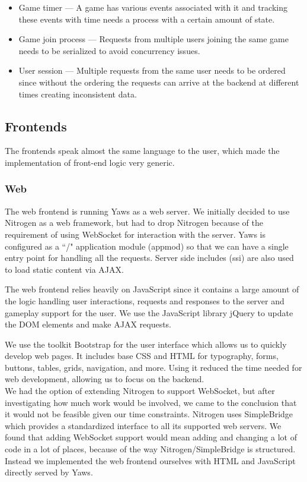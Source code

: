 \documentclass[11pt,a4paper]{report}
\begin{document}
\begin{itemize}
\item Game timer --- A game has various events associated with it and
tracking these events with time needs a process with a certain amount
of state.
\item Game join process --- Requests from multiple users joining the same
game needs to be serialized to avoid concurrency issues.
\item User session --- Multiple requests from the same user needs to be
ordered since without the ordering the requests can arrive at the backend
at different times creating inconsistent data.
\end{itemize}

\subsection{Frontends}
\label{sec:frontends}
The frontends speak almost the same language to the user, which made the
implementation of front-end logic very generic.

\subsubsection{Web}
The web frontend is running Yaws as a web server.
We initially decided to use Nitrogen as a web framework, but had to drop Nitrogen
because of the requirement of using WebSocket for interaction with the server.
Yaws is configured as a ``/" application module (appmod) so that we can have a
single entry point for handling all the requests. Server side includes (ssi) are
also used to load static content via AJAX.

The web frontend relies heavily on JavaScript since it contains a large amount
of the logic handling user interactions, requests and responses to the server
and gameplay support for the user. We use the JavaScript library jQuery
\cite{jquery} to update the DOM elements and make AJAX requests.

We use the toolkit Bootstrap\cite{bootstrap} for the user interface which
allows us to quickly develop web pages. It includes base CSS and HTML for
typography, forms, buttons, tables, grids, navigation, and more. Using it
reduced the time needed for web development, allowing us to focus on the
backend.\\

We had the option of extending Nitrogen to support WebSocket, but after
investigating how much work would be involved, we came to the conclusion that it
would not be feasible given our time constraints. Nitrogen uses SimpleBridge
which provides a standardized interface to all its supported web servers. We
found that adding WebSocket support would mean adding and changing a lot of
code in a lot of places, because of the way Nitrogen/SimpleBridge is structured.
Instead we implemented the web frontend ourselves with HTML and JavaScript
directly served by Yaws.
\end{document}
